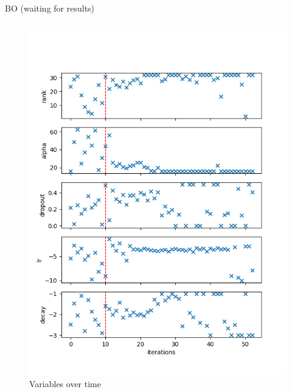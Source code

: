 \begin{frame}[allowframebreaks]{BO (waiting for results)}
\begin{columns}
        \begin{column}{0.35\textwidth}
            \begin{figure}
                \centering
                \includegraphics[width = \textwidth]{imgs/plots/exp12_variables_over_time.png}
                \caption{Variables over time}
            \end{figure}
            
            
        \end{column}
    \end{columns}  
\end{frame}

